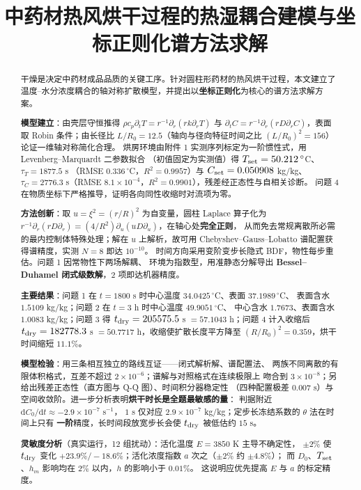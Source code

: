 \documentclass[bwprint]{cumcmthesis}
\title{中药材热风烘干过程的热湿耦合建模与坐标正则化谱方法求解}
\begin{document}
\maketitle

\begin{abstract}
\noindent
干燥是决定中药材成品品质的关键工序。针对圆柱形药材的热风烘干过程，本文建立了
温度--水分浓度耦合的轴对称扩散模型，并提出以\textbf{坐标正则化}为核心的谱方法求解方案。

\textbf{模型建立}：由壳层守恒推得 $\rho c_p\partial_tT=r^{-1}\partial_r(rk\partial_rT)$ 与
$\partial_tC=r^{-1}\partial_r(rD\partial_rC)$，表面取 Robin 条件；由长径比
$L/R_0=12.5$（轴向与径向特征时间之比 $(L/R_0)^2=156$）论证一维轴对称简化合理。
烘房环境由附件 1 实测序列标定为一阶惯性式，用 Levenberg--Marquardt 二参数拟合
（初值固定为实测值）得 $T_{\rm set}=50.212\,^\circ$C、$\tau_T=1877.5$ s
（RMSE $0.336\,^\circ$C，$R^2=0.9957$）与 $C_{\rm set}=0.050908$ kg/kg、
$\tau_C=2776.3$ s（RMSE $8.1\times10^{-4}$，$R^2=0.9901$），残差经正态性与自相关诊断。
问题 4 在物质坐标下严格推导，证明各向同性收缩时对流项为零。

\textbf{方法创新}：取 $u=\xi^2=(r/R)^2$ 为自变量，圆柱 Laplace 算子化为
$r^{-1}\partial_r(rD\partial_r)=(4/R^2)\partial_u(uD\partial_u)$，在轴心处\textbf{完全正则}，
从而免去常规离散所必需的最内控制体特殊处理；解在 $u$ 上解析，故可用
Chebyshev--Gauss--Lobatto 谱配置获得谱精度，实测 $N=8$ 即达 $10^{-10}$。
时间方向采用变阶变步长隐式 BDF，物性每步重估。问题 1 因常物性下两场解耦、
环境为指数型，用准静态分解导出 \textbf{Bessel--Duhamel 闭式级数解}，2 项即达机器精度。

\textbf{主要结果}：问题 1 在 $t=1800$ s 时中心温度 $34.0425\,^\circ$C、表面 $37.1989\,^\circ$C、
表面含水 $1.5109$ kg/kg；问题 2 在 $t=3$ h 时中心温度 $49.9051\,^\circ$C、
中心含水 $1.7673$、表面含水 $1.0083$ kg/kg；问题 3 得
$t_{\rm dry}=205575.5$ s $=57.1043$ h；问题 4 计入收缩后
$t_{\rm dry}=182778.3$ s $=50.7717$ h，收缩使扩散长度平方降至
$(R/R_0)^2=0.359$，烘干时间缩短 $11.1\%$。

\textbf{模型检验}：用三条相互独立的路线互证——闭式解析解、谱配置法、
两族不同离散的有限体积格式，互差不超过 $2\times10^{-6}$；谱解与对照格式在连续极限上
吻合到 $3\times10^{-8}$；另给出残差正态性（直方图与 Q-Q 图）、时间积分器稳定性
（四种配置极差 $0.007$ s）与空间收敛阶。进一步分析表明\textbf{烘干时长是全题最敏感的量}：
判据附近 $\mathrm{d}C_0/\mathrm{d}t\approx-2.9\times10^{-7}$ s$^{-1}$，
$1$ s 仅对应 $2.9\times10^{-7}$ kg/kg；定步长冻结系数的 $\theta$ 法在时间上只有
\textbf{一阶}精度，长时间段放宽步长会使 $t_{\rm dry}$ 被低估约 $15$ s。

\textbf{灵敏度分析}（真实运行，12 组扰动）：活化温度 $E=3850$ K 主导不确定性，
$\pm2\%$ 使 $t_{\rm dry}$ 变化 $+23.9\%/-18.6\%$；活化浓度指数 $a$ 次之（$\pm2\%$ 约 $\pm4.8\%$）；
而 $D_0$、$T_{\rm set}$、$h_m$ 影响均在 $2\%$ 以内，$h$ 的影响小于 $0.01\%$。
这说明应优先提高 $E$ 与 $a$ 的标定精度。

\end{abstract}
\end{document}
